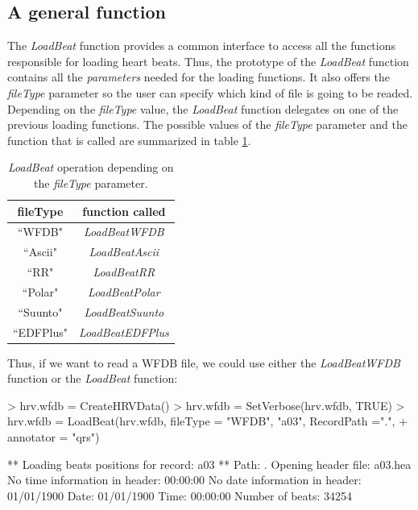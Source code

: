 \documentclass[12pt,lot, lof]{puthesis}
\begin{document}
\subsection{A general function} The \textit{LoadBeat} function provides a 
common interface to access all the functions responsible for loading heart 
beats. Thus, the prototype of the \textit{LoadBeat} function contains all the 
\textit{parameters} needed for the loading functions. It also offers the 
\textit{fileType} parameter so the user can specify which kind of file is going 
to be readed. Depending on the \textit{fileType} value, the \textit{LoadBeat} 
function delegates on one of the previous loading functions. The possible 
values of the \textit{fileType} parameter and the function that is called are 
summarized in table \ref{tab:loadbeat}.

\begin{table}
\begin{center}
\begin{tabular}{ |c| c| }
\hline
\textbf{fileType}&\textbf{function called}\\
\hline
``WFDB"&\textit{LoadBeatWFDB}\\
``Ascii"&\textit{LoadBeatAscii}\\
``RR"&\textit{LoadBeatRR}\\
``Polar"&\textit{LoadBeatPolar}\\
``Suunto"&\textit{LoadBeatSuunto}\\
``EDFPlus"&\textit{LoadBeatEDFPlus}\\
\hline
\end{tabular}
\caption{\textit{LoadBeat} operation depending on the \textit{fileType} 
parameter.}
\label{tab:loadbeat}
\end{center}
\end{table}
Thus, if we want to read a WFDB file, we could use either the  
\textit{LoadBeatWFDB} function or the \textit{LoadBeat} function:
\begin{Schunk}
\begin{Sinput}
> hrv.wfdb = CreateHRVData()
> hrv.wfdb = SetVerbose(hrv.wfdb, TRUE)
> hrv.wfdb = LoadBeat(hrv.wfdb, fileType = "WFDB", "a03", RecordPath =".", 
+ annotator = "qrs")
\end{Sinput}
\begin{Soutput}
** Loading beats positions for record: a03 **
   Path: . 
   Opening header file: a03.hea 
      No time information in header: 00:00:00 
      No date information in header: 01/01/1900 
   Date: 01/01/1900
   Time: 00:00:00
   Number of beats: 34254 
\end{Soutput}
\end{Schunk}
\end{document}
